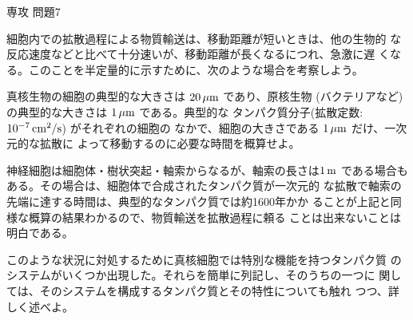 \documentclass[fleqn]{jbook}
\begin{document}
\begin{question}{専攻 問題7}{}


\begin{subquestions}
\SubQuestion
  細胞内での拡散過程による物質輸送は、移動距離が短いときは、他の生物的
  な反応速度などと比べて十分速いが、移動距離が長くなるにつれ、急激に遅
  くなる。このことを半定量的に示すために、次のような場合を考察しよう。

  真核生物の細胞の典型的な大きさは $20\,{\rm \mu m}$ であり、原核生物
  (バクテリアなど)の典型的な大きさは $1\,{\rm \mu m}$ である。典型的な
  タンパク質分子(拡散定数:$10^{-7}\,{\rm cm^2/s}$) がそれぞれの細胞の
  なかで、細胞の大きさである $1\,{\rm \mu m}$ だけ、一次元的な拡散に
  よって移動するのに必要な時間を概算せよ。


\SubQuestion
  神経細胞は細胞体・樹状突起・軸索からなるが、軸索の長さは$1\,{\rm m}$
  である場合もある。その場合は、細胞体で合成されたタンパク質が一次元的
  な拡散で軸索の先端に達する時間は、典型的なタンパク質では約1600年かか
  ることが上記と同様な概算の結果わかるので、物質輸送を拡散過程に頼る
  ことは出来ないことは明白である。

  このような状況に対処するために真核細胞では特別な機能を持つタンパク質
  のシステムがいくつか出現した。それらを簡単に列記し、そのうちの一つに
  関しては、そのシステムを構成するタンパク質とその特性についても触れ
  つつ、詳しく述べよ。

\end{subquestions}
\end{question}
\end{document}
